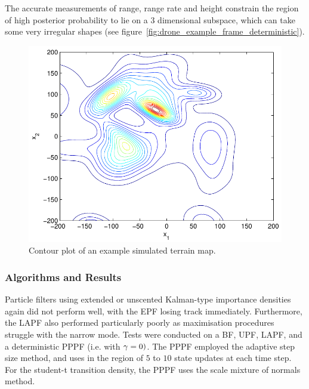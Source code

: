 \documentclass{article}
\begin{document}
The accurate measurements of range, range rate and height constrain the region of high posterior probability to lie on a $3$ dimensional subspace, which can take some very irregular shapes (see figure~\ref{fig:drone_example_frame_deterministic}). 
%
\begin{figure}
\centering
\includegraphics[width=0.7\columnwidth]{drone_terrain_map.pdf}
\caption{Contour plot of an example simulated terrain map.}
\label{fig:drone_terrain_map}
\end{figure}

\subsubsection{Algorithms and Results}

Particle filters using extended or unscented Kalman-type importance densities again did not perform well, with the EPF losing track immediately. Furthermore, the LAPF also performed particularly poorly as maximisation procedures struggle with the narrow mode. Tests were conducted on a BF, UPF, LAPF, and a deterministic PPPF (i.e. with $\gamma=0)$. The PPPF employed the adaptive step size method, and uses in the region of $5$ to $10$ state updates at each time step. For the student-t transition density, the PPPF uses the scale mixture of normals method.
\end{document}
